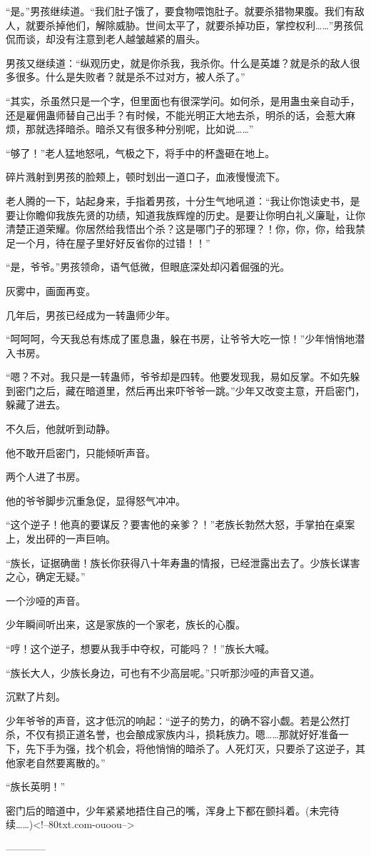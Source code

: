 \begin{this_body}
“是。”男孩继续道。“我们肚子饿了，要食物喂饱肚子。就要杀猎物果腹。我们有敌人，就要杀掉他们，解除威胁。世间太平了，就要杀掉功臣，掌控权利……”男孩侃侃而谈，却没有注意到老人越皱越紧的眉头。

男孩又继续道：“纵观历史，就是你杀我，我杀你。什么是英雄？就是杀的敌人很多很多。什么是失败者？就是杀不过对方，被人杀了。”

“其实，杀虽然只是一个字，但里面也有很深学问。如何杀，是用蛊虫亲自动手，还是雇佣蛊师替自己出手？有时候，不能光明正大地去杀，明杀的话，会惹大麻烦，那就选择暗杀。暗杀又有很多种分别呢，比如说……”

“够了！”老人猛地怒吼，气极之下，将手中的杯盏砸在地上。

碎片溅射到男孩的脸颊上，顿时划出一道口子，血液慢慢流下。

老人腾的一下，站起身来，手指着男孩，十分生气地吼道：“我让你饱读史书，是要让你瞻仰我族先贤的功绩，知道我族辉煌的历史。是要让你明白礼义廉耻，让你清楚正道荣耀。你居然给我悟出个杀？这是哪门子的邪理？！你，你，你，给我禁足一个月，待在屋子里好好反省你的过错！！”

“是，爷爷。”男孩领命，语气低微，但眼底深处却闪着倔强的光。

灰雾中，画面再变。

几年后，男孩已经成为一转蛊师少年。

“呵呵呵，今天我总有炼成了匿息蛊，躲在书房，让爷爷大吃一惊！”少年悄悄地潜入书房。

“嗯？不对。我只是一转蛊师，爷爷却是四转。他要发现我，易如反掌。不如先躲到密门之后，藏在暗道里，然后再出来吓爷爷一跳。”少年又改变主意，开启密门，躲藏了进去。

不久后，他就听到动静。

他不敢开启密门，只能倾听声音。

两个人进了书房。

他的爷爷脚步沉重急促，显得怒气冲冲。

“这个逆子！他真的要谋反？要害他的亲爹？！”老族长勃然大怒，手掌拍在桌案上，发出砰的一声巨响。

“族长，证据确凿！族长你获得八十年寿蛊的情报，已经泄露出去了。少族长谋害之心，确定无疑。”

一个沙哑的声音。

少年瞬间听出来，这是家族的一个家老，族长的心腹。

“哼！这个逆子，想要从我手中夺权，可能吗？！”族长大喊。

“族长大人，少族长身边，可也有不少高层呢。”只听那沙哑的声音又道。

沉默了片刻。

少年爷爷的声音，这才低沉的响起：“逆子的势力，的确不容小觑。若是公然打杀，不仅有损正道名誉，也会酿成家族内斗，损耗族力。嗯……那就好好准备一下，先下手为强，找个机会，将他悄悄的暗杀了。人死灯灭，只要杀了这逆子，其他家老自然要离散的。”

“族长英明！”

密门后的暗道中，少年紧紧地捂住自己的嘴，浑身上下都在颤抖着。(未完待续……)<!--80txt.com-ouoou-->

------------

\end{this_body}

